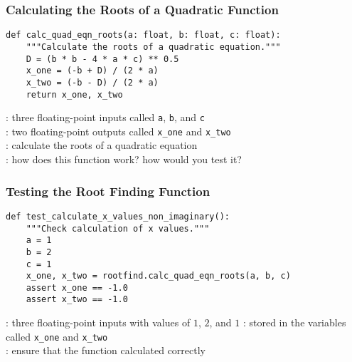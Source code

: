 \documentclass[14pt,aspectratio=169]{beamer}
\begin{document}
%
\begin{frame}[fragile]
  \frametitle{Calculating the Roots of a Quadratic Function}
  \hspace*{-.2in}
  \begin{minipage}{6in}
    \begin{verbatim}
def calc_quad_eqn_roots(a: float, b: float, c: float):
    """Calculate the roots of a quadratic equation."""
    D = (b * b - 4 * a * c) ** 0.5
    x_one = (-b + D) / (2 * a)
    x_two = (-b - D) / (2 * a)
    return x_one, x_two
    \end{verbatim}
  \end{minipage}
  \vspace*{.05in}
  \begin{center}
    \normalsize {}: three floating-point inputs called {\tt a}, {\tt b}, and {\tt c}\\
    \normalsize {}: two floating-point outputs called {\tt x\_one} and {\tt x\_two}\\
    \normalsize {}: calculate the roots of a quadratic equation\\
    \normalsize {}: how does this function work? how would you test it?
  \end{center}
\end{frame}

%
\begin{frame}[fragile]
  \frametitle{Testing the Root Finding Function}
  \hspace*{-.2in}
  \begin{minipage}{6in}
    \begin{verbatim}
def test_calculate_x_values_non_imaginary():
    """Check calculation of x values."""
    a = 1
    b = 2
    c = 1
    x_one, x_two = rootfind.calc_quad_eqn_roots(a, b, c)
    assert x_one == -1.0
    assert x_two == -1.0
    \end{verbatim}
  \end{minipage}
  \vspace*{.05in}
  \begin{center}
    \normalsize {}: three floating-point inputs with values of $1$, $2$, and $1$
    \normalsize {}: stored in the variables called {\tt x\_one} and {\tt x\_two}\\
    \normalsize {}: ensure that the function calculated correctly\\
  \end{center}
\end{frame}
\end{document}
